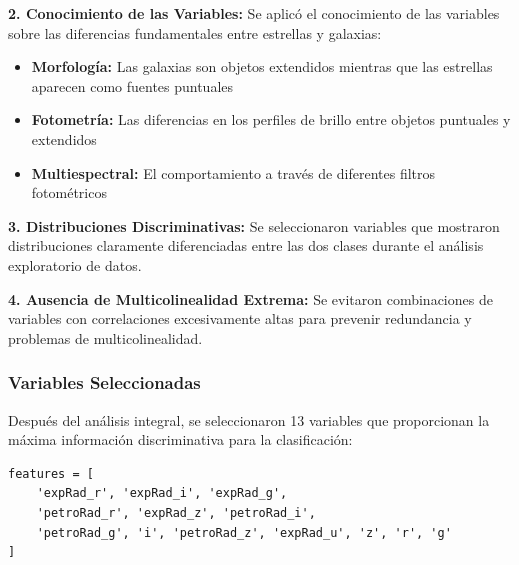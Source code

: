 \documentclass{article}
\begin{document}
\textbf{2. Conocimiento de las Variables:}
Se aplicó el conocimiento de las variables sobre las diferencias fundamentales entre estrellas y galaxias:
\begin{itemize}
    \item \textbf{Morfología:} Las galaxias son objetos extendidos mientras que las estrellas aparecen como fuentes puntuales
    \item \textbf{Fotometría:} Las diferencias en los perfiles de brillo entre objetos puntuales y extendidos
    \item \textbf{Multiespectral:} El comportamiento a través de diferentes filtros fotométricos
\end{itemize}

\textbf{3. Distribuciones Discriminativas:}
Se seleccionaron variables que mostraron distribuciones claramente diferenciadas entre las dos clases durante el análisis exploratorio de datos.

\textbf{4. Ausencia de Multicolinealidad Extrema:}
Se evitaron combinaciones de variables con correlaciones excesivamente altas para prevenir redundancia y problemas de multicolinealidad.

\subsubsection{Variables Seleccionadas}

Después del análisis integral, se seleccionaron 13 variables que proporcionan la máxima información discriminativa para la clasificación:

\begin{verbatim}
features = [
    'expRad_r', 'expRad_i', 'expRad_g',
    'petroRad_r', 'expRad_z', 'petroRad_i',
    'petroRad_g', 'i', 'petroRad_z', 'expRad_u', 'z', 'r', 'g'
]
\end{verbatim}


\end{document}
